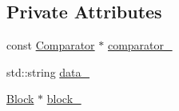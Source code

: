\subsection*{Private Attributes}
\begin{DoxyCompactItemize}
\item 
const \hyperlink{structleveldb_1_1_comparator}{Comparator} $\ast$ \hyperlink{classleveldb_1_1_block_constructor_a8032f2282569a0e187c2b05e4020c348}{comparator\-\_\-}
\item 
std\-::string \hyperlink{classleveldb_1_1_block_constructor_a16288721d4801a1211ae00295866a142}{data\-\_\-}
\item 
\hyperlink{classleveldb_1_1_block}{Block} $\ast$ \hyperlink{classleveldb_1_1_block_constructor_a1ad4f51fb9369b137462a6693b6a69ae}{block\-\_\-}
\end{DoxyCompactItemize}


